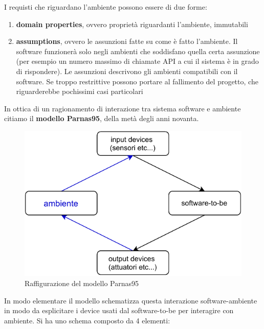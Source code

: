 \documentclass[a4paper,12pt, oneside]{book}
\begin{document}
I requisti che riguardano l'ambiente possono essere di due forme:
\begin{enumerate}
  \item \textbf{domain properties}, ovvero proprietà riguardanti l'ambiente,
  immutabili
  \item \textbf{assumptions}, ovvero le assunzioni fatte su come è fatto
  l'ambiente. Il software funzionerà solo negli ambienti che soddisfano quella
  certa assunzione (per esempio un numero massimo di chiamate API a cui il
  sistema è in grado di rispondere). Le assunzioni descrivono gli ambienti
  compatibili con il software. Se troppo restrittive possono portare al
  fallimento del progetto, che riguarderebbe pochissimi casi particolari
\end{enumerate}
In ottica di un ragionamento di interazione tra sistema software e ambiente
citiamo il \textbf{modello Parnas95}, della metà degli anni novanta. 
\begin{figure}
  \centering
  \includegraphics[scale = 0.7]{img/re.pdf}
  \caption{Raffigurazione del modello Parnas95}
\end{figure}
\newpage
In modo elementare il modello schematizza
questa interazione software-ambiente in modo da esplicitare i device usati dal
software-to-be per interagire con ambiente. Si ha uno schema composto da 4
elementi:
\end{document}
